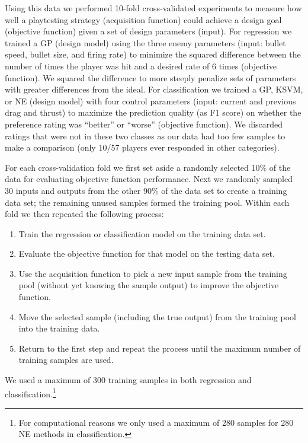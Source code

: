 \documentclass{sig-alternate}
\begin{document}
Using this data we performed 10-fold cross-validated experiments to measure how well a playtesting strategy (acquisition function) could achieve a design goal (objective function) given a set of design parameters (input).
For regression we trained a GP (design model) using the three enemy parameters (input: bullet speed, bullet size, and firing rate) to minimize the squared difference between the number of times the player was hit and a desired rate of 6 times (objective function).
We squared the difference to more steeply penalize sets of parameters with greater differences from the ideal.
For classification we trained a GP, KSVM, or NE (design model) with four control parameters (input: current and previous drag and thrust) to maximize the prediction quality (as F1 score) on whether the preference rating was ``better'' or ``worse'' (objective function).
We discarded ratings that were not in these two classes as our data had too few samples to make a comparison (only 10/57 players ever responded in other categories).


For each cross-validation fold we first set aside a randomly selected 10\% of the data for evaluating objective function performance.
Next we randomly sampled 30 inputs and outputs from the other 90\% of the data set to create a training data set; the remaining unused samples formed the training pool.
Within each fold we then repeated the following process:
\begin{enumerate}
\item Train the regression or classification model on the training data set.
\item Evaluate the objective function for that model on the testing data set.
\item Use the acquisition function to pick a new input sample from the training pool (without yet knowing the sample output) to improve the objective function.
\item Move the selected sample (including the true output) from the training pool into the training data.
\item Return to the first step and repeat the process until the maximum number of training samples are used.
\end{enumerate}
\noindent We used a maximum of 300 training samples in both regression and classification.\footnote{For computational reasons we only used a maximum of 280 samples for 280 NE methods in classification.}
\end{document}
